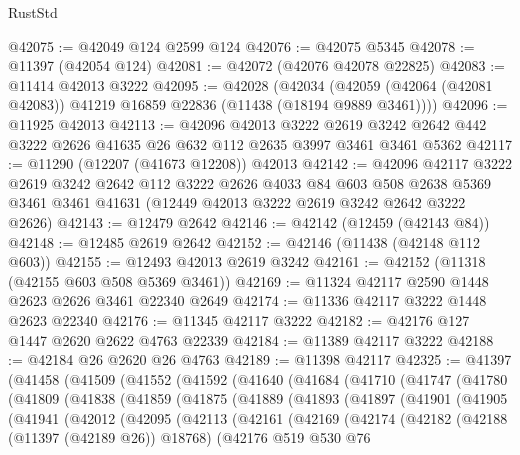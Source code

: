 \begin{lexlean}{RustStd}
\begin{coremodule}
@42075 := @42049 @124 @2599 @124
@42076 := @42075 @5345
@42078 := @11397 (@42054 @124)
@42081 := @42072 (@42076 @42078 @22825)
@42083 := @11414 @42013 @3222
@42095 := @42028
    (@42034 (@42059 (@42064 (@42081 @42083)) @41219 @16859 @22836 (@11438 (@18194 @9889 @3461))))
@42096 := @11925 @42013
@42113 := @42096
    @42013
    @3222
    @2619
    @3242
    @2642
    @442
    @3222
    @2626
    @41635
    @26
    @632
    @112
    @2635
    @3997
    @3461
    @3461
    @5362
@42117 := @11290 (@12207 (@41673 @12208)) @42013
@42142 := @42096
    @42117
    @3222
    @2619
    @3242
    @2642
    @112
    @3222
    @2626
    @4033
    @84
    @603
    @508
    @2638
    @5369
    @3461
    @3461
    @41631
    (@12449 @42013 @3222 @2619 @3242 @2642 @3222 @2626)
@42143 := @12479 @2642
@42146 := @42142 (@12459 (@42143 @84))
@42148 := @12485 @2619 @2642
@42152 := @42146 (@11438 (@42148 @112 @603))
@42155 := @12493 @42013 @2619 @3242
@42161 := @42152 (@11318 (@42155 @603 @508 @5369 @3461))
@42169 := @11324 @42117 @2590 @1448 @2623 @2626 @3461 @22340 @2649
@42174 := @11336 @42117 @3222 @1448 @2623 @22340
@42176 := @11345 @42117 @3222
@42182 := @42176 @127 @1447 @2620 @2622 @4763 @22339
@42184 := @11389 @42117 @3222
@42188 := @42184 @26 @2620 @26 @4763
@42189 := @11398 @42117
@42325 := @41397
    (@41458
      (@41509
        (@41552
          (@41592
            (@41640
              (@41684
                (@41710
                  (@41747
                    (@41780
                      (@41809
                        (@41838
                          (@41859
                            (@41875
                              (@41889
                                (@41893
                                  (@41897
                                    (@41901
                                      (@41905
                                        (@41941
                                          (@42012
                                            (@42095
                                              (@42113
                                                (@42161
                                                  (@42169
                                                    (@42174
                                                      (@42182
                                                        (@42188 (@11397 (@42189 @26)) @18768)
                                                        (@42176
                                                          @519
                                                          @530
                                                          @76

\end{coremodule}
\end{lexlean}
